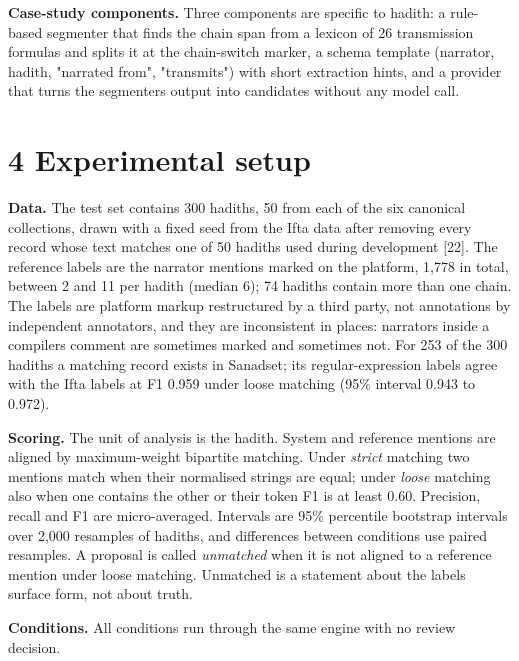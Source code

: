 \documentclass[
  english,
]{article}
\begin{document}
\textbf{Case-study components.} Three components are specific to hadith:
a rule-based segmenter that finds the chain span from a lexicon of 26
transmission formulas and splits it at the chain-switch marker, a schema
template (narrator, hadith, "narrated from", "transmits") with short
extraction hints, and a provider that turns the
segmenter\textquotesingle s output into candidates without any model
call.

\section{4 Experimental setup}\label{experimental-setup}

\textbf{Data.} The test set contains 300 hadiths, 50 from each of the
six canonical collections, drawn with a fixed seed from the Ifta data
after removing every record whose text matches one of 50 hadiths used
during development {[}22{]}. The reference labels are the narrator
mentions marked on the platform, 1,778 in total, between 2 and 11 per
hadith (median 6); 74 hadiths contain more than one chain. The labels
are platform markup restructured by a third party, not annotations by
independent annotators, and they are inconsistent in places: narrators
inside a compiler\textquotesingle s comment are sometimes marked and
sometimes not. For 253 of the 300 hadiths a matching record exists in
Sanadset; its regular-expression labels agree with the Ifta labels at F1
0.959 under loose matching (95\% interval 0.943 to 0.972).

\textbf{Scoring.} The unit of analysis is the hadith. System and
reference mentions are aligned by maximum-weight bipartite matching.
Under \emph{strict} matching two mentions match when their normalised
strings are equal; under \emph{loose} matching also when one contains
the other or their token F1 is at least 0.60. Precision, recall and F1
are micro-averaged. Intervals are 95\% percentile bootstrap intervals
over 2,000 resamples of hadiths, and differences between conditions use
paired resamples. A proposal is called \emph{unmatched} when it is not
aligned to a reference mention under loose matching. Unmatched is a
statement about the labels\textquotesingle{} surface form, not about
truth.

\textbf{Conditions.} All conditions run through the same engine with no
review decision.
\end{document}

